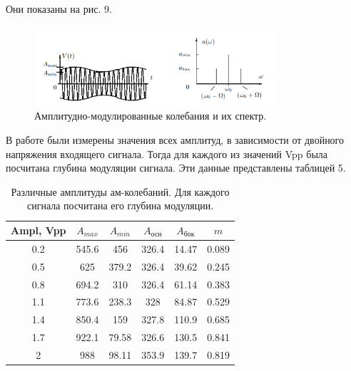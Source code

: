 \documentclass[a4paper, 14pt]{extarticle}%
\newcommand\ECaption[1]{%
     \captionsetup{font=footnotesize}%
     \caption{#1}}
\begin{document}
Они показаны на рис. 9.

\begin{figure}[h!]
\begin{center}
\includegraphics[width=0.8\textwidth]{m}
\end{center}
\ECaption{Амплитудно-модулированные колебания и их спектр.}
\end{figure}

В работе были измерены значения всех амплитуд, в зависимости от двойного напряжения входящего сигнала. Тогда для каждого из значений Vpp была посчитана глубина модуляции сигнала. Эти данные представлены таблицей 5.

\begin{table}[h!]
\begin{center}
\begin{tabular}{|c|c|c|c|c|c|}
\hline
\rowcolor[HTML]{9698ED} 
Ampl, Vpp & $A_{max}$ & $A_{min}$ & $A_{\text{осн}}$ & $A_{\text{бок}}$ & $m$   \\ \hline
0.2       & 545.6     & 456       & 326.4            & 14.47            & 0.089 \\ \hline
\rowcolor[HTML]{9698ED} 
0.5       & 625       & 379.2     & 326.4            & 39.62            & 0.245 \\ \hline
0.8       & 694.2     & 310       & 326.4            & 61.14            & 0.383 \\ \hline
\rowcolor[HTML]{9698ED} 
1.1       & 773.6     & 238.3     & 328              & 84.87            & 0.529 \\ \hline
1.4       & 850.4     & 159       & 327.8            & 110.9            & 0.685 \\ \hline
\rowcolor[HTML]{9698ED} 
1.7       & 922.1     & 79.58     & 326.6            & 130.5            & 0.841 \\ \hline
2         & 988       & 98.11     & 353.9            & 139.7            & 0.819 \\ \hline
\end{tabular}
\ECaption{Различные амплитуды ам-колебаний. Для каждого сигнала посчитана его глубина модуляции.}
\end{center}
\end{table}
\end{document}
